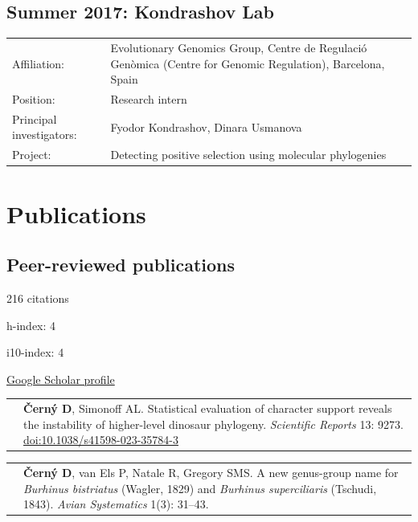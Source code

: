 \documentclass[10pt]{article}
\begin{document}
\subsection*{Summer 2017: Kondrashov Lab}

\begin{tabularx}{\textwidth}{>{\raggedleft\arraybackslash}p{3.6cm} X}
Affiliation: & Evolutionary Genomics Group, Centre de Regulaci\'{o} Gen\`{o}mica (Centre for Genomic Regulation), Barcelona, Spain \\[0.1cm]
Position: & Research intern \\[0.1cm]
Principal investigators: & Fyodor Kondrashov, Dinara Usmanova \\[0.1cm]
Project: & Detecting positive selection using molecular phylogenies \\[0.1cm]
\end{tabularx}

\section*{Publications}

\subsection*{Peer-reviewed publications}

\begin{center}
  \begin{itemize*}
    \item 216 citations \hspace*{1cm}
    \item h-index: 4 \hspace*{1cm}
    \item i10-index: 4 \hspace*{1cm}
    \item \href{https://scholar.google.com/citations?user=LFXFNAMAAAAJ}{Google Scholar profile}
  \end{itemize*}
\end{center}

\noindent \begin{tabularx}{\textwidth}{>{\raggedleft\arraybackslash}p{2.2cm} X}
2023 & \textbf{\v{C}ern\'{y} D}, Simonoff AL. Statistical evaluation of character support reveals the instability of higher-level dinosaur phylogeny. \textit{Scientific Reports} 13: 9273. \href{http://doi.org/10.1038/s41598-023-35784-3}{doi:10.1038/s41598-023-35784-3}
\end{tabularx}
\noindent \begin{tabularx}{\textwidth}{>{\raggedleft\arraybackslash}p{2.2cm} X}
2023 & \textbf{\v{C}ern\'{y} D}, van Els P, Natale R, Gregory SMS. A new genus-group name for \textit{Burhinus bistriatus} (Wagler, 1829) and \textit{Burhinus superciliaris} (Tschudi, 1843). \textit{Avian Systematics} 1(3): 31--43.
\end{tabularx}
\end{document}
